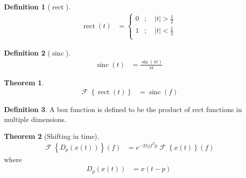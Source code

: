 \documentclass[titlepage, fleqn, a4paper, 12pt, twoside]{article}
\theoremstyle{definition}
\newtheorem{definition}{Definition}
\theoremstyle{theorem}
\newtheorem{theorem}{Theorem}
\DeclareMathOperator{\FT}{\mathcal{F}}
\DeclareMathOperator{\rect}{\mathrm{rect}}
\DeclareMathOperator{\sinc}{\mathrm{sinc}}
\begin{document}
\begin{definition}[$\rect$]
	\begin{align*}
		\rect(t) &=
			\begin{cases}
				0 &;\quad |t| > \frac{1}{2}\\
				1 &;\quad |t| < \frac{1}{2}\\
			\end{cases}
	\end{align*}
\end{definition}

\begin{definition}[$\sinc$]
	\begin{align*}
		\sinc(t) &= \frac{\sin(\pi t)}{\pi t}
	\end{align*}
\end{definition}

\begin{theorem}
	\begin{align*}
		\FT\left\{ \rect(t) \right\} &= \sinc(f)
	\end{align*}
\end{theorem}

\begin{definition}
	A box function is defined to be the product of rect functions in multiple dimensions.
\end{definition}

\begin{theorem}[Shifting in time]
	\begin{align*}
		\FT\left\{ D_p\left( x(t) \right) \right\}(f) &= e^{-2 \pi j f^T p} \FT\left\{ x(t) \right\}(f)
	\end{align*}
	where
	\begin{align*}
		D_p\left( x(t) \right) &= x(t - p)
	\end{align*}
	\label{thm:shifting_in_time}
\end{theorem}
\end{document}
